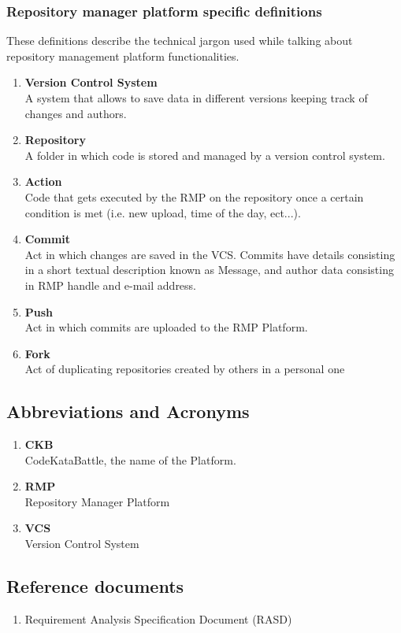 \subsubsection[short]{Repository manager platform specific definitions}
These definitions describe the technical jargon used while talking about repository management platform functionalities.
\begin{enumerate}[label=$\bullet$]
    \item \textbf{Version Control System}\\A system that allows to save data in different versions keeping track of changes and authors.
    \item \textbf{Repository}\\A folder in which code is stored and managed by a version control system.
    \item \textbf{Action}\\Code that gets executed by the RMP on the repository once a certain condition is met (i.e. new upload, time of the day, ect...).
    \item \textbf{Commit}\\Act in which changes are saved in the VCS. Commits have details consisting in a short textual description known as Message, and author data consisting in RMP handle and e-mail address.
    \item \textbf{Push}\\Act in which commits are uploaded to the RMP Platform.
    \item \textbf{Fork}\\Act of duplicating repositories created by others in a personal one
\end{enumerate}
\subsection{Abbreviations and Acronyms}
\begin{enumerate}[label=$\bullet$]
    \item \textbf{CKB}\\CodeKataBattle, the name of the Platform.
    \item \textbf{RMP}\\Repository Manager Platform
    \item \textbf{VCS}\\Version Control System
\end{enumerate}
\subsection{Reference documents}
\begin{enumerate}[label=$\bullet$]
    \item Requirement Analysis Specification Document (RASD)
\end{enumerate}
